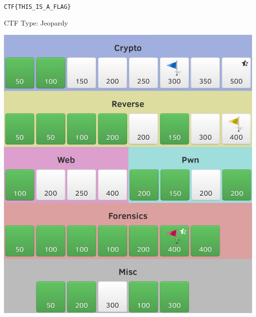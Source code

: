 \begin{frame}[fragile]{}
	 \begin{center}
	 	\Huge\verb+CTF{THIS_IS_A_FLAG}+
	 \end{center}
\end{frame}

\begin{frame}
  {CTF Type: Jeopardy}

  \begin{center}
    \includegraphics[height=0.8\textheight]{./images/sharifctf-challenges.jpg}
  \end{center}
\end{frame}

